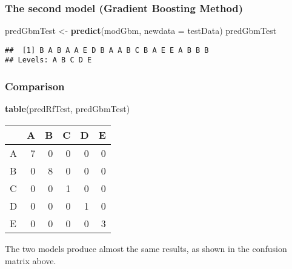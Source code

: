 \documentclass[
]{article}
\newenvironment{Shaded}{\begin{snugshade}}{\end{snugshade}}
\newcommand{\AttributeTok}[1]{\textcolor[rgb]{0.13,0.29,0.53}{#1}}
\newcommand{\FunctionTok}[1]{\textcolor[rgb]{0.13,0.29,0.53}{\textbf{#1}}}
\newcommand{\NormalTok}[1]{#1}
\newcommand{\OtherTok}[1]{\textcolor[rgb]{0.56,0.35,0.01}{#1}}
\begin{document}
\hypertarget{the-second-model-gradient-boosting-method}{%
\subsubsection{The second model (Gradient Boosting
Method)}\label{the-second-model-gradient-boosting-method}}

\begin{Shaded}
\begin{Highlighting}[]
\NormalTok{predGbmTest }\OtherTok{\textless{}{-}} \FunctionTok{predict}\NormalTok{(modGbm, }\AttributeTok{newdata =}\NormalTok{ testData)}
\NormalTok{predGbmTest}
\end{Highlighting}
\end{Shaded}

\begin{verbatim}
##  [1] B A B A A E D B A A B C B A E E A B B B
## Levels: A B C D E
\end{verbatim}

\hypertarget{comparison}{%
\subsubsection{Comparison}\label{comparison}}

\begin{Shaded}
\begin{Highlighting}[]
\FunctionTok{table}\NormalTok{(predRfTest, predGbmTest)}
\end{Highlighting}
\end{Shaded}

\begin{tabular}{l|r|r|r|r|r}
\hline
  & A & B & C & D & E\\
\hline
A & 7 & 0 & 0 & 0 & 0\\
\hline
B & 0 & 8 & 0 & 0 & 0\\
\hline
C & 0 & 0 & 1 & 0 & 0\\
\hline
D & 0 & 0 & 0 & 1 & 0\\
\hline
E & 0 & 0 & 0 & 0 & 3\\
\hline
\end{tabular}

The two models produce almost the same results, as shown in the
confusion matrix above.
\end{document}
